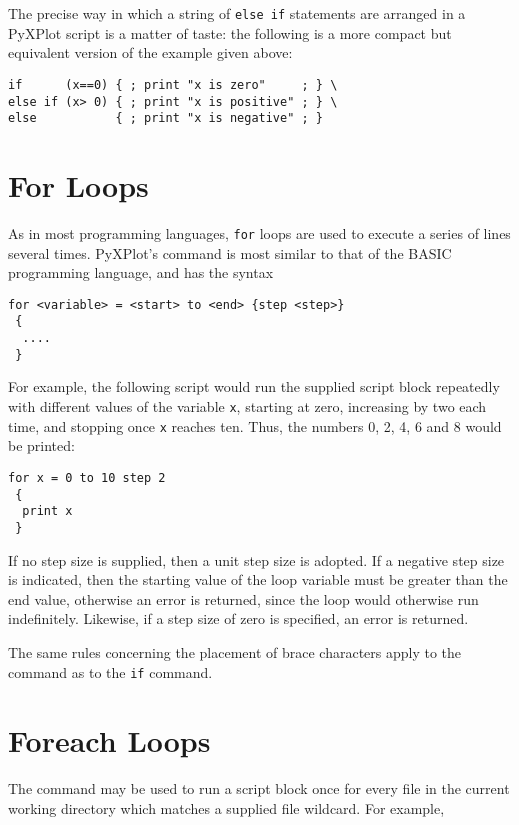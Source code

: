 The precise way in which a string of {\tt else if} statements are arranged in a
PyXPlot script is a matter of taste: the following is a more compact but
equivalent version of the example given above:

\begin{verbatim}
if      (x==0) { ; print "x is zero"     ; } \
else if (x> 0) { ; print "x is positive" ; } \
else           { ; print "x is negative" ; }
\end{verbatim}

\section{For Loops}

As in most programming languages, {\tt for} loops are used to execute a series
of lines several times. PyXPlot's  command is most similar to that
of the BASIC programming language, and has the syntax

\begin{verbatim}
for <variable> = <start> to <end> {step <step>}
 {
  ....
 }
\end{verbatim}

\noindent For example, the following script would run the supplied script block
repeatedly with different values of the variable {\tt x}, starting at zero,
increasing by two each time, and stopping once {\tt x} reaches ten. Thus, the
numbers 0, 2, 4, 6 and 8 would be printed:

\begin{verbatim}
for x = 0 to 10 step 2
 {
  print x
 }
\end{verbatim}

If no step size is supplied, then a unit step size is adopted. If a negative
step size is indicated, then the starting value of the loop variable must be
greater than the end value, otherwise an error is returned, since the loop
would otherwise run indefinitely. Likewise, if a step size of zero is
specified, an error is returned.

The same rules concerning the placement of brace characters apply to the
 command as to the {\tt if} command.

\section{Foreach Loops}

The  command may be used to run a script block once for every
file in the current working directory which matches a supplied file wildcard.
For example,

